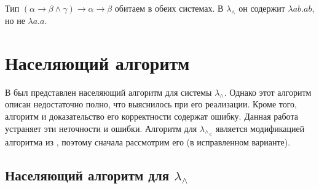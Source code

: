 \documentclass{spbau-diploma}
\begin{document}
\begin{notice}
    Тип  $(\alpha \to \beta \wedge \gamma) \to \alpha \to \beta$ обитаем в обеих системах. В $\lambda_{\wedge}$ он содержит $\lambda a b . a b$, но не $\lambda a . a$.
\end{notice}

\section{Населяющий алгоритм}

В \cite{kusmierek_07} был представлен населяющий алгоритм для системы $\lambda_\wedge$. Однако этот  алгоритм описан недостаточно полно, что выяснилось при его реализации. Кроме того, алгоритм и доказательство его корректности содержат ошибку. Данная работа устраняет эти неточности и ошибки. Алгоритм для $\lambda_\wedge_\leqslant$ является модификацией алгоритма из \cite{kusmierek_07}, поэтому сначала рассмотрим его (в исправленном варианте).


\subsection{Населяющий алгоритм для $\lambda_\wedge$}
\end{document}
